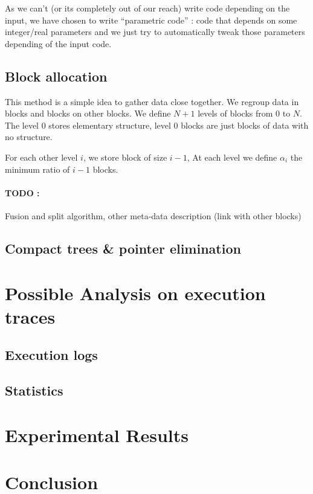 \documentclass[12pt]{article}
\begin{document}
As we can't (or its completely out of our reach) write code
depending on the input, we have chosen to write ``parametric code'' : code that
depends on some integer/real parameters and we just try to automatically tweak
those parameters depending of the input code.

\subsection{Block allocation}

This method is a simple idea to gather data close together. We regroup data in
blocks and blocks on other blocks. We define $N +1$ levels of blocks from 0 to
$N$. The level $0$ stores elementary structure, level $0$ blocks are just blocks of
data with no structure.

For each other level $i$, we store block of size $i-1$, At each level we define
$\alpha_i$ the minimum ratio of $i-1$ blocks.


\paragraph{TODO :} Fusion and split algorithm, other meta-data description (link
with other blocks)




\subsection{Compact trees \& pointer elimination}







\section{Possible Analysis on execution traces}
\label{logs}

\subsection{Execution logs}

\subsection{Statistics}

\section{Experimental Results}



\section{Conclusion}
\end{document}
